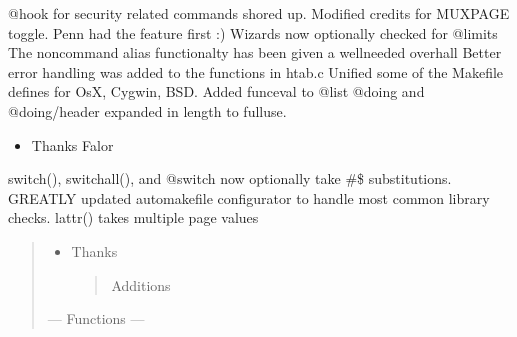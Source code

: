 \documentclass[letterpaper,10pt,english]{sphinxmanual}
\begin{document}
\sphinxAtStartPar
@hook for security related commands shored up.
Modified credits for MUXPAGE toggle.  Penn had the feature first :)
Wizards now optionally checked for @limits
The non\sphinxhyphen{}command alias functionalty has been given a well\sphinxhyphen{}needed overhall
Better error handling was added to the functions in htab.c
Unified some of the Makefile defines for OsX, Cygwin, BSD.
Added funceval to @list
@doing and @doing/header expanded in length to full\sphinxhyphen{}use.
\begin{itemize}
\item {} 
\sphinxAtStartPar
Thanks Falor

\end{itemize}

\sphinxAtStartPar
switch(), switchall(), and @switch now optionally take \#\$ substitutions.
GREATLY updated auto\sphinxhyphen{}makefile configurator to handle most common library checks.
lattr() takes multiple page values
\begin{quote}
\begin{itemize}
\item {} 
\sphinxAtStartPar
Thanks 
\begin{quote}

\sphinxAtStartPar
Additions
\end{quote}

\end{itemize}

\sphinxAtStartPar
— Functions —
\end{quote}
\end{document}
